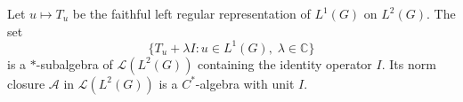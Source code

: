 \begin{definition}
Let $u \mapsto T_u$ be the faithful left regular representation of $L^1(G)$ on $L^2(G)$. The set
$$\{T_u + \lambda I : u \in L^1(G),\; \lambda \in \mathbb{C}\}$$
is a $*$-subalgebra of $\mathcal{L}(L^2(G))$ containing the identity operator $I$. Its norm closure $\mathcal{A}$ in $\mathcal{L}(L^2(G))$ is a $C^*$-algebra with unit $I$.
\end{definition}
